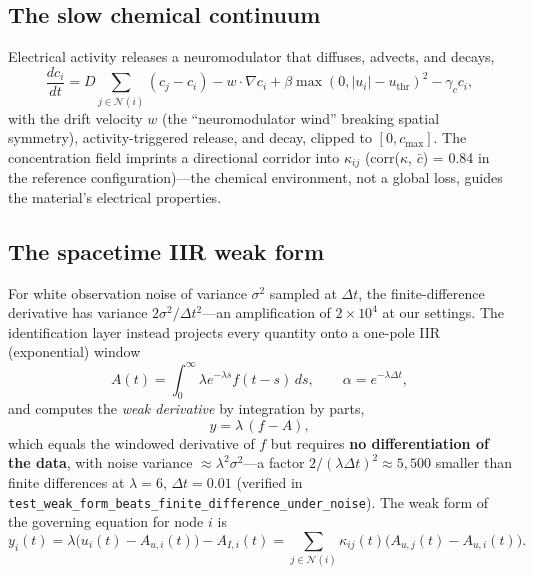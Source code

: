 \documentclass[11pt]{article}
\begin{document}
\subsection{The slow chemical continuum}
Electrical activity releases a neuromodulator that diffuses, advects, and decays,
\begin{equation}
\frac{dc_i}{dt} = D \sum_{j \in \mathcal{N}(i)}(c_j - c_i) - w \cdot \nabla c_i
+ \beta \max(0, |u_i| - u_{\mathrm{thr}})^2 - \gamma_c c_i,
\end{equation}
with the drift velocity $w$ (the ``neuromodulator wind'' breaking spatial symmetry),
activity-triggered release, and decay, clipped to $[0, c_{\max}]$. The concentration
field imprints a directional corridor into $\kappa_{ij}$ (corr($\kappa$, $\bar c$) =
0.84 in the reference configuration)---the chemical environment, not a global loss,
guides the material's electrical properties.

\subsection{The spacetime IIR weak form}
\label{sec:methods-weak}
For white observation noise of variance $\sigma^2$ sampled at $\Delta t$, the
finite-difference derivative has variance $2\sigma^2/\Delta t^2$---an amplification of
$2 \times 10^4$ at our settings. The identification layer instead projects every
quantity onto a one-pole IIR (exponential) window
\begin{equation}
A(t) = \int_0^\infty \lambda e^{-\lambda s} f(t-s)\,ds, \qquad
\alpha = e^{-\lambda \Delta t},
\end{equation}
and computes the \emph{weak derivative} by integration by parts,
\begin{equation}
y = \lambda\,(f - A),
\end{equation}
which equals the windowed derivative of $f$ but requires \textbf{no differentiation of
the data}, with noise variance $\approx \lambda^2 \sigma^2$---a factor
$2/(\lambda \Delta t)^2 \approx 5{,}500$ smaller than finite differences at
$\lambda = 6$, $\Delta t = 0.01$ (verified in
\texttt{test\_weak\_form\_beats\_finite\_difference\_under\_noise}). The weak form of
the governing equation for node $i$ is
\begin{equation}
y_i(t) = \lambda\bigl(u_i(t) - A_{u,i}(t)\bigr) - A_{I,i}(t)
= \sum_{j \in \mathcal{N}(i)} \kappa_{ij}(t)\bigl(A_{u,j}(t) - A_{u,i}(t)\bigr).
\end{equation}
\end{document}
